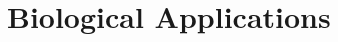 \section{Biological Applications}
\label{sec:biological-applications}
\begin{frame}{\insertsubsection}
    
\end{frame}